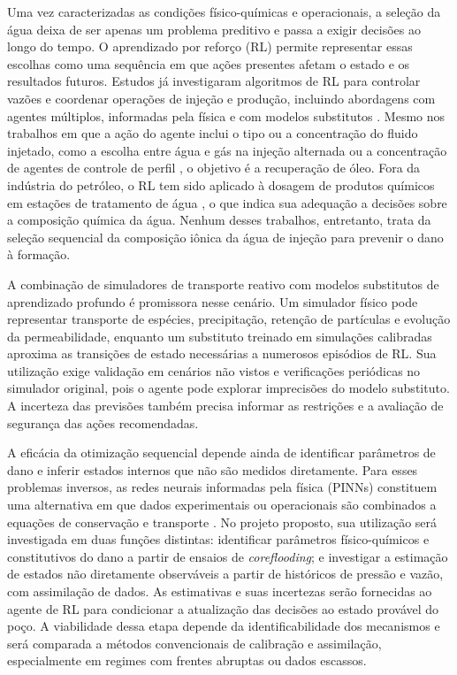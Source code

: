 \documentclass[10pt,a4paper]{article}
\begin{document}
Uma vez caracterizadas as condições físico-químicas e operacionais, a seleção da água deixa de ser apenas um problema preditivo e passa a exigir decisões ao longo do tempo. O aprendizado por reforço (RL) permite representar essas escolhas como uma sequência em que ações presentes afetam o estado e os resultados futuros. Estudos já investigaram algoritmos de RL para controlar vazões e coordenar operações de injeção e produção, incluindo abordagens com agentes múltiplos, informadas pela física e com modelos substitutos \cite{nasir2022,abdalla2025,sac2025}. Mesmo nos trabalhos em que a ação do agente inclui o tipo ou a concentração do fluido injetado, como a escolha entre água e gás na injeção alternada \cite{jin2026wag} ou a concentração de agentes de controle de perfil \cite{tan2023pcod}, o objetivo é a recuperação de óleo. Fora da indústria do petróleo, o RL tem sido aplicado à dosagem de produtos químicos em estações de tratamento de água \cite{alvarez2024dss,zhang2026dosing}, o que indica sua adequação a decisões sobre a composição química da água. Nenhum desses trabalhos, entretanto, trata da seleção sequencial da composição iônica da água de injeção para prevenir o dano à formação.

A combinação de simuladores de transporte reativo com modelos substitutos de aprendizado profundo é promissora nesse cenário. Um simulador físico pode representar transporte de espécies, precipitação, retenção de partículas e evolução da permeabilidade, enquanto um substituto treinado em simulações calibradas aproxima as transições de estado necessárias a numerosos episódios de RL. Sua utilização exige validação em cenários não vistos e verificações periódicas no simulador original, pois o agente pode explorar imprecisões do modelo substituto. A incerteza das previsões também precisa informar as restrições e a avaliação de segurança das ações recomendadas.

A eficácia da otimização sequencial depende ainda de identificar parâmetros de dano e inferir estados internos que não são medidos diretamente. Para esses problemas inversos, as redes neurais informadas pela física (PINNs) constituem uma alternativa em que dados experimentais ou operacionais são combinados a equações de conservação e transporte \cite{raissi2019}. No projeto proposto, sua utilização será investigada em duas funções distintas: identificar parâmetros físico-químicos e constitutivos do dano a partir de ensaios de \textit{coreflooding}; e investigar a estimação de estados não diretamente observáveis a partir de históricos de pressão e vazão, com assimilação de dados. As estimativas e suas incertezas serão fornecidas ao agente de RL para condicionar a atualização das decisões ao estado provável do poço. A viabilidade dessa etapa depende da identificabilidade dos mecanismos e será comparada a métodos convencionais de calibração e assimilação, especialmente em regimes com frentes abruptas ou dados escassos.
\end{document}
